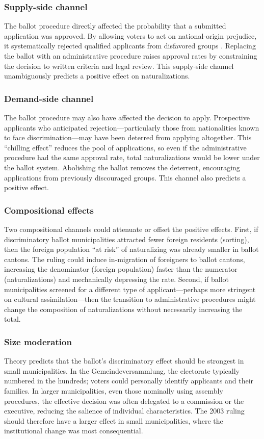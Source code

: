 \documentclass[12pt]{article}
\begin{document}
\subsubsection*{Supply-side channel} The ballot procedure directly affected the probability that a submitted application was approved. By allowing voters to act on national-origin prejudice, it systematically rejected qualified applicants from disfavored groups \citep{hainmueller2013}. Replacing the ballot with an administrative procedure raises approval rates by constraining the decision to written criteria and legal review. This supply-side channel unambiguously predicts a positive effect on naturalizations.

\subsubsection*{Demand-side channel} The ballot procedure may also have affected the decision to apply. Prospective applicants who anticipated rejection---particularly those from nationalities known to face discrimination---may have been deterred from applying altogether. This ``chilling effect'' reduces the pool of applications, so even if the administrative procedure had the same approval rate, total naturalizations would be lower under the ballot system. Abolishing the ballot removes the deterrent, encouraging applications from previously discouraged groups. This channel also predicts a positive effect.

\subsubsection*{Compositional effects} Two compositional channels could attenuate or offset the positive effects. First, if discriminatory ballot municipalities attracted fewer foreign residents (sorting), then the foreign population ``at risk'' of naturalizing was already smaller in ballot cantons. The ruling could induce in-migration of foreigners to ballot cantons, increasing the denominator (foreign population) faster than the numerator (naturalizations) and mechanically depressing the rate. Second, if ballot municipalities screened for a different type of applicant---perhaps more stringent on cultural assimilation---then the transition to administrative procedures might change the composition of naturalizations without necessarily increasing the total.

\subsubsection*{Size moderation} Theory predicts that the ballot's discriminatory effect should be strongest in small municipalities. In the Gemeindeversammlung, the electorate typically numbered in the hundreds; voters could personally identify applicants and their families. In larger municipalities, even those nominally using assembly procedures, the effective decision was often delegated to a commission or the executive, reducing the salience of individual characteristics. The 2003 ruling should therefore have a larger effect in small municipalities, where the institutional change was most consequential.
\end{document}
